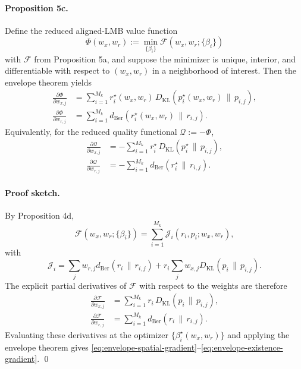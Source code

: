 \paragraph{Proposition 5c.}
Define the reduced aligned-LMB value function
\begin{equation}
\Phi(w_x,w_r)
:=
\min_{\{\beta_i\}}
\mathcal{F}(w_x,w_r;\{\beta_i\})
\end{equation}
with $\mathcal{F}$ from Proposition 5a, and suppose the minimizer is unique, interior, and differentiable with respect to $(w_x,w_r)$ in a neighborhood of interest. Then the envelope theorem \citep{MilgromSegal2002} yields
\begin{align}
\frac{\partial \Phi}{\partial w_{x,j}}
&=
\sum_{i=1}^{M_k}
r_i^\star(w_x,w_r)\,
D_{\mathrm{KL}}\!\left(p_i^\star(w_x,w_r)\,\|\,p_{i,j}\right),
\label{eq:envelope-spatial-gradient}
\\
\frac{\partial \Phi}{\partial w_{r,j}}
&=
\sum_{i=1}^{M_k}
d_{\mathrm{Ber}}\!\left(r_i^\star(w_x,w_r)\,\|\,r_{i,j}\right).
\label{eq:envelope-existence-gradient}
\end{align}
Equivalently, for the reduced quality functional $\mathcal{Q}:=-\Phi$,
\begin{align}
\frac{\partial \mathcal{Q}}{\partial w_{x,j}}
&=
-
\sum_{i=1}^{M_k}
r_i^\star\,
D_{\mathrm{KL}}\!\left(p_i^\star\,\|\,p_{i,j}\right),
\\
\frac{\partial \mathcal{Q}}{\partial w_{r,j}}
&=
-
\sum_{i=1}^{M_k}
d_{\mathrm{Ber}}\!\left(r_i^\star\,\|\,r_{i,j}\right).
\end{align}

\paragraph{Proof sketch.}
By Proposition 4d,
\begin{equation}
\mathcal{F}(w_x,w_r;\{\beta_i\})
=
\sum_{i=1}^{M_k}\mathcal{J}_i(r_i,p_i;w_x,w_r),
\end{equation}
with
\begin{equation}
\mathcal{J}_i
=
\sum_j w_{r,j}d_{\mathrm{Ber}}(r_i\,\|\,r_{i,j})
+
r_i\sum_j w_{x,j}D_{\mathrm{KL}}(p_i\,\|\,p_{i,j}).
\end{equation}
The explicit partial derivatives of $\mathcal{F}$ with respect to the weights are therefore
\begin{align}
\frac{\partial \mathcal{F}}{\partial w_{x,j}}
&=
\sum_{i=1}^{M_k}
r_i\,D_{\mathrm{KL}}(p_i\,\|\,p_{i,j}),
\\
\frac{\partial \mathcal{F}}{\partial w_{r,j}}
&=
\sum_{i=1}^{M_k}
d_{\mathrm{Ber}}(r_i\,\|\,r_{i,j}).
\end{align}
Evaluating these derivatives at the optimizer $\{\beta_i^\star(w_x,w_r)\}$ and applying the envelope theorem gives \eqref{eq:envelope-spatial-gradient}--\eqref{eq:envelope-existence-gradient}. \qed

